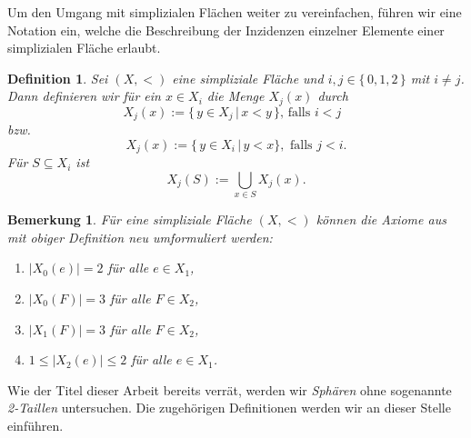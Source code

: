 \documentclass[12pt,titlepage,twoside,cleardoublepage]{article}
\theoremstyle{nummermitklammern}
\newtheorem{lemma}[temp]{Lemma}
\newtheorem{definition}[temp]{Definition}
\newtheorem{bemerkung}[temp]{Bemerkung}
\newtheorem{definition}[zahl]{Definition}
\newtheorem{lemma}[zahl]{Lemma}
\newtheorem{bemerkung}[zahl]{Bemerkung}
\numberwithin{equation}{section}
\begin{document}





Um den Umgang mit simplizialen Flächen weiter zu vereinfachen, führen wir eine Notation ein, welche die Beschreibung der Inzidenzen einzelner Elemente einer simplizialen Fläche erlaubt.
\begin{definition} 
Sei $(X,<)$ eine simpliziale Fläche und $i,j \in \{\,0,1,2\,\}$ mit $i \neq j$. Dann definieren wir für ein $x \in X_{i}$ die Menge $X_j(x)$ durch
\[
X_{j}(x):=\{\,y \in X_{j}\,|\,x < y\,\} \text{, falls $i < j$  }
\]
bzw. 
\[
X_{j}(x):=\{\,y \in X_{i}\,|\,y < x\}, \text{ falls $j<i$}.
\]
Für $S \subseteq X_{i}$ ist 
\[
X_j(S):= \bigcup_{x\in S}X_{j}(x).
\]
\end{definition}
\begin{bemerkung}
Für eine simpliziale Fläche $(X,<)$ können die Axiome aus  mit obiger Definition neu umformuliert werden:
\begin{enumerate}
\item $\vert X_{0}(e)\vert=2$ für alle $e \in X_{1}$,
\item $\vert X_{0}(F)\vert=3$ für alle $F \in X_{2}$,
\item $\vert X_{1}(F)\vert=3$ für alle $F \in X_{2}$,
\item $1\leq  \vert X_{2}(e)\vert \leq 2$ für alle $e \in X_{1}$.
\end{enumerate}
\end{bemerkung}
Wie der Titel dieser Arbeit bereits verrät, werden wir \emph{Sphären} ohne sogenannte \emph{2-Taillen} untersuchen. Die zugehörigen Definitionen werden wir an dieser Stelle einführen.
\end{document}
